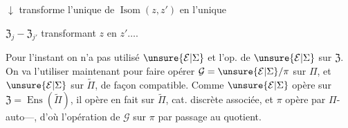 $\downarrow$ transforme l'unique  de $\operatorname{Isom}(z,z')$ en l'unique  $\mathfrak Z_j\mathbin{-}\mathfrak Z_{j'}$ transformant $z$ en $z'\ldots.$

Pour l'instant on n'a pas utilisé $\unsure{\mathcal E|\Sigma}$ et l'op. de $\unsure{\mathcal E|\Sigma}$ sur $\mathfrak Z$. On va l'utiliser maintenant pour faire opérer $\mathcal G=\unsure{\mathcal E|\Sigma}/\pi$ sur $\Pi$, et $\unsure{\mathcal E|\Sigma}$ sur $\widetilde\Pi$, de façon compatible.
Comme $\unsure{\mathcal E|\Sigma}$ opère sur $\mathfrak Z=\operatorname{Ens}(\widetilde\Pi)$, il opère en fait sur $\widetilde\Pi$, cat. discrète associée,  et  $\pi$ opère par $\Pi$-auto---, d'où l'opération de $\mathcal G$ sur $\pi$ par passage au quotient.
